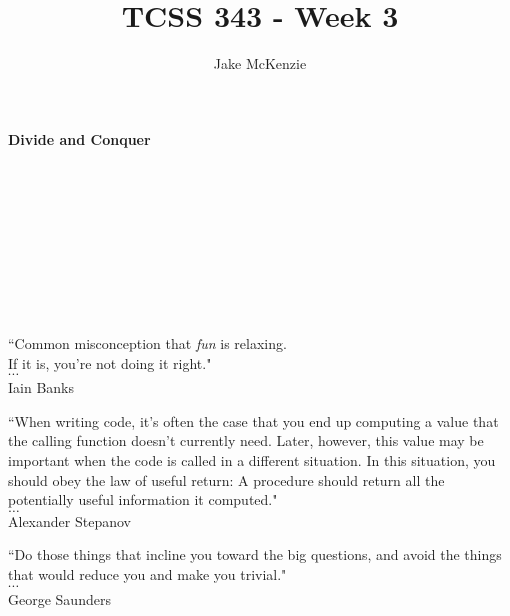 \documentclass[12pt]{article}
\begin{document}
\title{TCSS 343 - Week 3}
\author{Jake McKenzie}
\maketitle
\noindent\centerline{\textbf{Divide and Conquer}}\\\\\\\\\\\\\\\\
\begin{center}
    ``Common misconception that \textit{fun} is relaxing. \\If it is, you’re not doing it right." \\$\cdots$\\ Iain Banks
\end{center}
\begin{center}
    ``When writing code, it’s often the case that you end up computing a value that the calling function doesn’t currently need. Later, however, this value may be important when the code is called in a different situation. In this situation, you should obey the law of useful return: A procedure should return all the potentially useful information it computed." \\
    $\dots$\\
    Alexander Stepanov
\end{center}
\begin{center}
    ``Do those things that incline you toward the big questions, and avoid the things that would reduce you and make you trivial." \\$\cdots$\\ George Saunders 
\end{center}
\newpage
\end{document}

